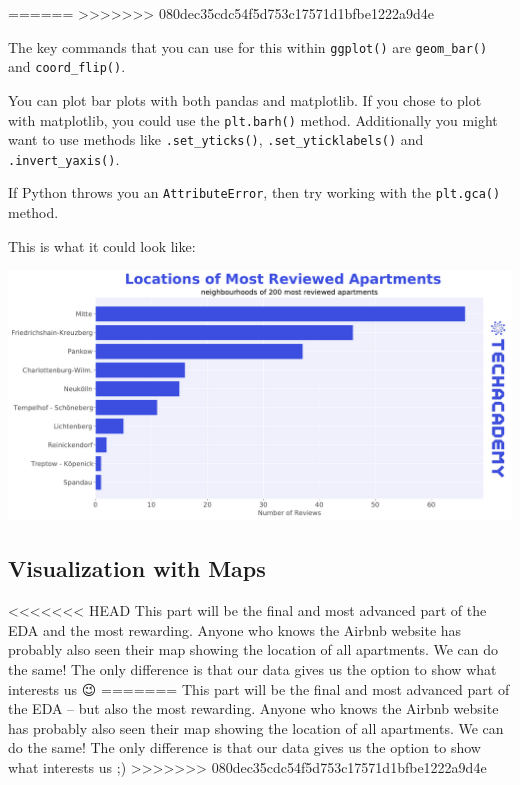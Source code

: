 \documentclass[
  11pt,
]{article}
\newenvironment{tips}[1]
  {
  \begin{itemize}
  \footnotesize
  \renewcommand{\labelitemi}{
    \raisebox{-.7\height}[0pt][0pt]{
      {\setkeys{Gin}{width=3em,keepaspectratio}
        \texttt{[image: images/\#1.png]}}
    }
  }
  \setlength{\fboxsep}{1em}
  \begin{rbox}
  \item
  }
  {
  \end{rbox}
  \end{itemize}
  }
\newenvironment{tipsp}[1]
  {
  \begin{itemize}
  \footnotesize
  \renewcommand{\labelitemi}{
    \raisebox{-.7\height}[0pt][0pt]{
      {\setkeys{Gin}{width=3em,keepaspectratio}
        \texttt{[image: images/\#1.png]}}
    }
  }
  \setlength{\fboxsep}{1em}
  \begin{pbox}
  \item
  }
  {
  \end{pbox}
  \end{itemize}
  }
\begin{document}
\begin{tips}
=======
>>>>>>> 080dec35cdc54f5d753c17571d1bfbe1222a9d4e
\begin{tips}r
The key commands that you can use for this within \texttt{ggplot()} are \texttt{geom\_bar()} and \texttt{coord\_flip()}.

\end{tips}

\begin{tipsp}p
You can plot bar plots with both pandas and matplotlib.
If you chose to plot with matplotlib, you could use the \texttt{plt.barh()} method.
Additionally you might want to use methods like \texttt{.set\_yticks()}, \texttt{.set\_yticklabels()} and \texttt{.invert\_yaxis()}.

If Python throws you an \texttt{AttributeError}, then try working with the \texttt{plt.gca()} method.

\end{tipsp}

This is what it could look like:

\begin{center}\includegraphics[width=1\linewidth]{plot/01_python/hbars_reviews} \end{center}

\hypertarget{visualization-with-maps}{%
\subsection{Visualization with Maps}\label{visualization-with-maps}}

<<<<<<< HEAD
This part will be the final and most advanced part of the EDA and the most rewarding.
Anyone who knows the Airbnb website has probably also seen their map showing the location of all apartments.
We can do the same!
The only difference is that our data gives us the option to show what interests us 😉
=======
This part will be the final and most advanced part of the EDA -- but also the most rewarding. Anyone who knows the Airbnb website has probably also seen their map showing the location of all apartments. We can do the same! The only difference is that our data gives us the option to show what interests us ;)
>>>>>>> 080dec35cdc54f5d753c17571d1bfbe1222a9d4e


\end{tips}
\end{document}
